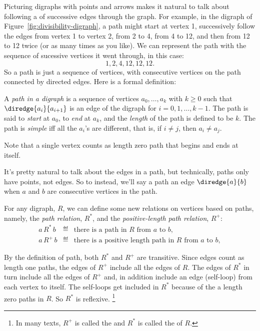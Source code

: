 Picturing digraphs with points and arrows makes it natural to talk
about following a  of successive edges through the graph.
For example, in the digraph of Figure~\ref{fig:divisibility-digraph},
a path might start at vertex 1, successively follow the edges from
vertex 1 to vertex 2, from 2 to 4, from 4 to 12, and then from 12 to
12 twice (or as many times as you like).  We can represent the path
with the sequence of sucessive vertices it went through, in this case:
\[
1,2,4,12,12,12.
\]
So a path is just a sequence of vertices, with consecutive vertices on
the path connected by directed edges.  Here is a formal
definition:

\begin{definition}\label{paths}
A \emph{path in a digraph} is a sequence of vertices $a_0,\dots,a_k$
with $k \ge 0$ such that $\diredge{a_i}{a_{i+1}}$ is an edge of the
digraph for $i = 0,1,\dots, k-1$.  The path is said to \emph{start} at
$a_0$, to \emph{end} at $a_k$, and the \emph{length} of the path is
defined to be $k$.  The path is \emph{simple} iff all the $a_i$'s are
different, that is, if $i \neq j$, then $a_i \neq a_j$.
\end{definition}
Note that a single vertex counts as length zero path that begins and
ends at itself.

It's pretty natural to talk about the edges in a path, but
technically, paths only have points, not edges.  So to instead, we'll
say a path  an edge $\diredge{a}{b}$ when $a$ and $b$
are consecutive vertices in the path.

For any digraph, $R$, we can define some new relations on vertices
based on paths, namely, the \emph{path relation}, $R^*$, and the
\emph{positive-length path relation}, $R^+$:
\begin{eqnarray*}
a\, R^*\, b &\eqdef& \mbox{there is a path in $R$ from $a$ to $b$},\\
a\, R^+\, b &\eqdef& \mbox{there is a positive length path in $R$ from $a$ to $b$},
\end{eqnarray*}

By the definition of path, both $R^*$ and $R^+$ are transitive.  Since
edges count as length one paths, the edges of $R^+$ include all the
edges of $R$.  The edges of $R^*$ in turn include all the edges of
$R^+$ and, in addition include an edge (self-loop) from each vertex to
itself.  The self-loops get included in $R^*$ because of the a length
zero paths in $R$.  So $R^*$ is reflexive.  \footnote{In many texts,
  $R^+$ is called the  and $R^*$ is called
  the  of $R$.}

